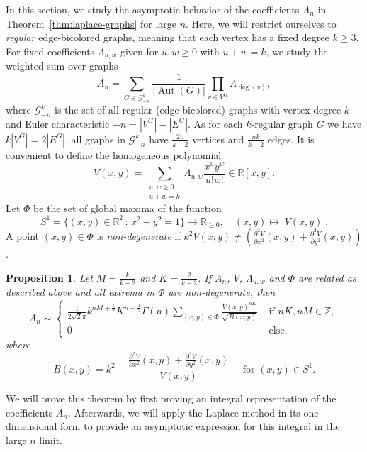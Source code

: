 \documentclass[english]{ourlematemasingle}
\numberwithin{theorem}{section}
\newtheorem{proposition}[theorem]{Proposition}
\theoremstyle{remark}
\newcommand{\GG}{\mathcal{G}}
\newcommand{\R}{\mathbb{R}}
\newcommand{\Z}{\mathbb{Z}}
\DeclareMathOperator{\Aut}{Aut}
\newcommand{\ol}{\Lambda}
\begin{document}
In this section, we study the asymptotic behavior of the coefficients 
$A_n$ in Theorem~\ref{thm:laplace-graphs} for large $n$. 
Here, we will restrict ourselves to 
\emph{regular} edge-bicolored graphs, 
meaning that each vertex has a fixed degree $k \geq 3.$
For fixed coefficients $\ol_{u,w}$ given for $u,w\geq 0$ with $u+w=k$, we study the weighted sum over graphs
\[
A_n = \sum_{G \in \GG_{-n}^k} 
        \frac{1}{
\left\lvert \Aut(G) \right\rvert} 
\prod \limits _{v\in V^G}
\ol_{\deg(v)},
\]
where $\GG_{-n}^k$ is the set of all regular (edge-bicolored) graphs with vertex degree $k$
and Euler characteristic $-n=|V^G|-|E^G|$.
As for each $k$-regular graph $G$ we have $k|V^G| = 2|E^G|$,
all graphs in $\GG_{-n}^k$ have $\frac{2n}{k-2}$ vertices and 
$\frac{n k}{k-2}$ edges.
It is convenient to define the homogeneous polynomial
$$V(x,y) = \sum_{\substack{u,w \geq 0\\ u+w = k}} \ol_{u,w} \frac{x^u y^w}{u!w!} \in \R[x,y].$$
Let $\Phi$ be the set of global maxima of the function 
\[
    S^1=  \{ (x,y) \in \R^2 \,:\, x^2+y^2=1 \} \rightarrow \R_{\geq 0},\quad (x,y) \mapsto |V(x,y)|.
\]
A point $(x,y) \in \Phi$ is \emph{non-degenerate} if
$k^2V(x,y) \neq \left( \frac{\partial^2 V}{\partial x^2}(x,y) + \frac{\partial^2 V}{\partial y^2}(x,y) \right)$. 

\begin{proposition}
\label{prop:AnAsy}
Let $M = \frac{k}{k-2}$ and $K=\frac{2}{k-2}$.
If $A_n$, $V$, $\ol_{u,w}$ and $\Phi$ are related as described above and all extrema in $\Phi$ are non-degenerate, then
$$
A_n \sim 
\begin{cases}
\frac{1}{2\sqrt{2}\pi}k^{nM+\frac{1}{2}}K^{n-\frac{1}{2}}\Gamma(n) 
\sum\limits_{(x,y) \in \Phi} \frac{V(x,y)^{nK}}{\sqrt{B(x,y)}}
&\text{ if } nK, nM \in \Z,
\\
0 &\text{ else,}
\end{cases}
$$
where
$$
B(x,y) = 
k^2 - 
\frac{ \frac{\partial^2 V}{\partial x^2}(x,y) + \frac{\partial^2 V}{\partial y^2}(x,y)}{ V(x,y) } \quad \text{ for } (x,y)\in S^1.
$$
\end{proposition}

We will prove this theorem by first proving an 
integral representation of the coefficients $A_n$.
Afterwards, we will apply the Laplace method in its 
 one dimensional form to provide an asymptotic expression for this 
integral in the large $n$ limit.
\end{document}
